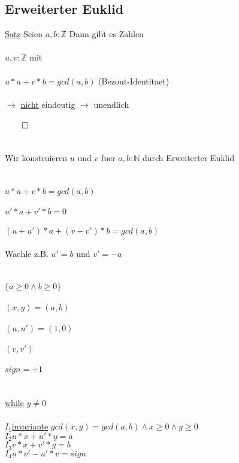 \documentclass[18pt,a4paper]{article}
\newcommand{\tab}{\hspace*{2em}}
\begin{document}
\subsection{Erweiterter Euklid}

\uline{Satz} Seien $a,b : \mathbb{Z}$ Dann gibt es Zahlen \\
\\
\tab $u,v: \mathbb{Z}$ mit\\
\\
\tab $u * a + v * b = gcd(a,b)$ (Bezout-Identitaet)\\
\\
\tab $\rightarrow$ \uline{nicht} eindeutig $\rightarrow$ unendlich\\
\\
$\qed$\\
\\
\\
Wir konstruieren $u$ und $v$ fuer $a,b : \mathbb{N}$ durch Erweiterter Euklid\\
\\
\\
$u*a + v*b = gcd(a,b)$\\
\\
$u' *a + v' *b =0$\\
\\
$(u+u')*a + (v+v') *b = gcd(a,b)$\\
\\
Waehle z.B. $u' =b$ und $v' = -a$\\
\\
\\
$\{ a\geqslant 0 \wedge b\geqslant 0\}$\\
\\
$(x,y) = (a,b)$\\
\\
$(u,u') = (1,0)$\\
\\
$(v,v')$\\
\\
$sign = +1$\\
\\
\\
\uline{while} $y \neq 0$ \\
\\
$I_1$\tab \uline{invariante} $gcd(x,y) = gcd(a,b) \wedge x\geqslant 0 \wedge y\geqslant 0$\\
$I_2$\tab \tab \tab $u*x + u'*y = a$\\
$I_3$\tab \tab \tab$v*x + v'*y = b$\\
$I_4$\tab \tab \tab$u*v' - u'*v = sign$\\
\end{document}
